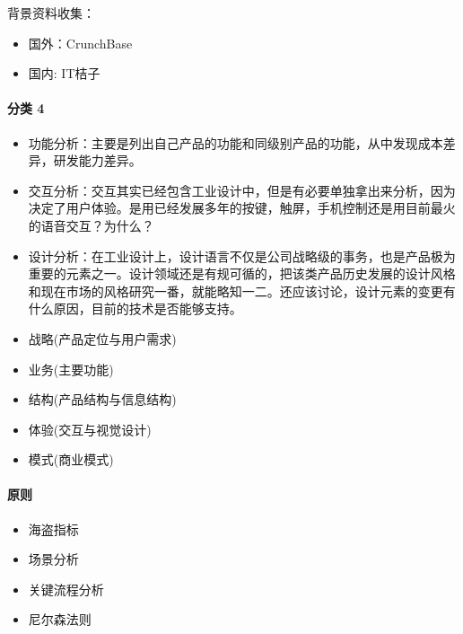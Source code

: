 \documentclass[letterpaper,10pt,english]{sphinxmanual}
\begin{document}
背景资料收集：
\begin{itemize}
\item {} 
国外：CrunchBase

\item {} 
国内: IT桔子

\end{itemize}


\paragraph{分类 4\sphinxfootnotemark[522]}
\label{\detokenize{chapter_knowledge/goods_analysis:id6}}%
\begin{footnotetext}[522]\sphinxAtStartFootnote
{}
%
\end{footnotetext}\ignorespaces \begin{itemize}
\item {} 
功能分析：主要是列出自己产品的功能和同级别产品的功能，从中发现成本差异，研发能力差异。

\item {} 
交互分析：交互其实已经包含工业设计中，但是有必要单独拿出来分析，因为决定了用户体验。是用已经发展多年的按键，触屏，手机控制还是用目前最火的语音交互？为什么？

\item {} 
设计分析：在工业设计上，设计语言不仅是公司战略级的事务，也是产品极为重要的元素之一。设计领域还是有规可循的，把该类产品历史发展的设计风格和现在市场的风格研究一番，就能略知一二。还应该讨论，设计元素的变更有什么原因，目前的技术是否能够支持。

\item {} 
战略(产品定位与用户需求)

\item {} 
业务(主要功能)

\item {} 
结构(产品结构与信息结构)

\item {} 
体验(交互与视觉设计)

\item {} 
模式(商业模式)%
\begin{footnote}[523]\sphinxAtStartFootnote
{}
%
\end{footnote}

\end{itemize}


\paragraph{原则}
\label{\detokenize{chapter_knowledge/goods_analysis:id7}}\begin{itemize}
\item {} 
海盗指标

\item {} 
场景分析

\item {} 
关键流程分析

\item {} 
尼尔森法则

\end{itemize}
\end{document}
